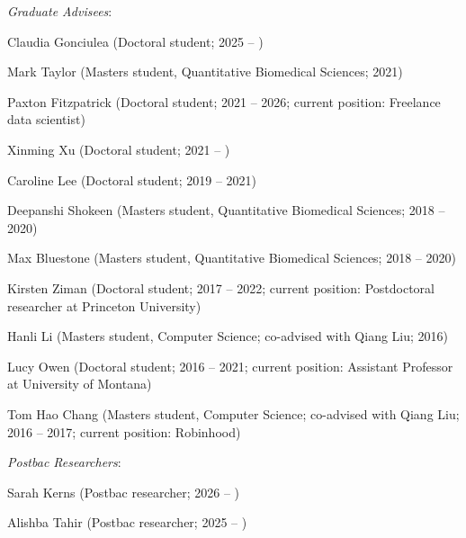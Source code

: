 \documentclass[11pt, a4paper]{article} %
\begin{document}
\textit{Graduate Advisees}:
\begin{etaremune}
\item Claudia Gonciulea (Doctoral student; 2025 -- )
\item Mark Taylor (Masters student, Quantitative Biomedical Sciences; 2021)
\item Paxton Fitzpatrick (Doctoral student; 2021 -- 2026; current position: Freelance data scientist)
\item Xinming Xu (Doctoral student; 2021 -- )
\item Caroline Lee (Doctoral student; 2019 -- 2021)
\item Deepanshi Shokeen (Masters student, Quantitative Biomedical
Sciences; 2018 -- 2020)
\item Max Bluestone (Masters student, Quantitative Biomedical
Sciences; 2018 -- 2020)
\item Kirsten Ziman (Doctoral student; 2017 -- 2022; current position: Postdoctoral researcher at Princeton University)
\item Hanli Li (Masters student, Computer Science; co-advised with Qiang
Liu; 2016)
\item Lucy Owen (Doctoral student; 2016 -- 2021; current position: Assistant Professor at University of Montana)
\item Tom Hao Chang (Masters student, Computer Science; co-advised with
Qiang Liu; 2016 -- 2017; current position: Robinhood)
\end{etaremune}

\textit{Postbac Researchers}:
\begin{etaremune}
\item Sarah Kerns (Postbac researcher; 2026 -- )
\item Alishba Tahir (Postbac researcher; 2025 -- )
\end{etaremune}
\end{document}
